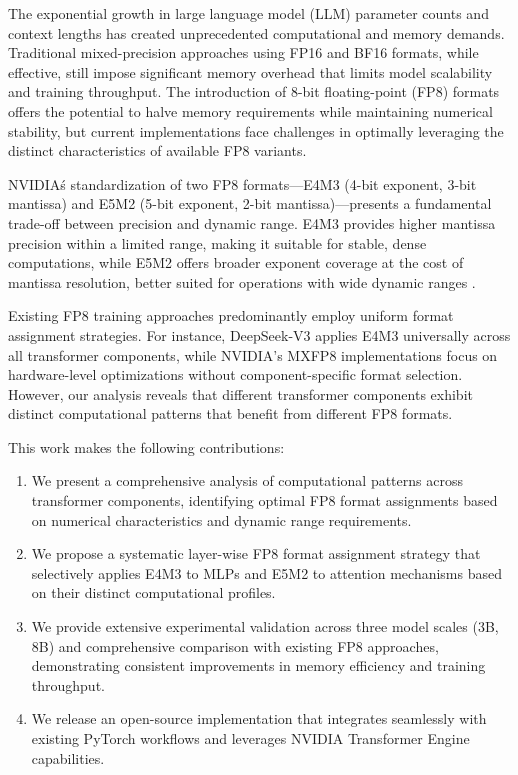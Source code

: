 \documentclass[conference]{IEEEtran}
\begin{document}
The exponential growth in large language model (LLM) parameter counts and context lengths has created unprecedented computational and memory demands. Traditional mixed-precision approaches using FP16 and BF16 formats, while effective, still impose significant memory overhead that limits model scalability and training throughput. The introduction of 8-bit floating-point (FP8) formats \cite{micikevicius2022fp8formatsdeeplearning} offers the potential to halve memory requirements while maintaining numerical stability, but current implementations face challenges in optimally leveraging the distinct characteristics of available FP8 variants.

NVIDIA\'s standardization of two FP8 formats—E4M3 (4-bit exponent, 3-bit mantissa) and E5M2 (5-bit exponent, 2-bit mantissa)—presents a fundamental trade-off between precision and dynamic range. E4M3 provides higher mantissa precision within a limited range, making it suitable for stable, dense computations, while E5M2 offers broader exponent coverage at the cost of mantissa resolution, better suited for operations with wide dynamic ranges \cite{nvidia2022fp8}.

Existing FP8 training approaches predominantly employ uniform format assignment strategies. For instance, DeepSeek-V3 \cite{deepseekv3} applies E4M3 universally across all transformer components, while NVIDIA's MXFP8 implementations \cite{nvidia2024mxfp8} focus on hardware-level optimizations without component-specific format selection. However, our analysis reveals that different transformer components exhibit distinct computational patterns that benefit from different FP8 formats.

This work makes the following contributions:

\begin{enumerate}
\item We present a comprehensive analysis of computational patterns across transformer components, identifying optimal FP8 format assignments based on numerical characteristics and dynamic range requirements.

\item We propose a systematic layer-wise FP8 format assignment strategy that selectively applies E4M3 to MLPs and E5M2 to attention mechanisms based on their distinct computational profiles.

\item We provide extensive experimental validation across three model scales (3B, 8B) and comprehensive comparison with existing FP8 approaches, demonstrating consistent improvements in memory efficiency and training throughput.

\item We release an open-source implementation that integrates seamlessly with existing PyTorch workflows and leverages NVIDIA Transformer Engine capabilities.
\end{enumerate}
\end{document}
